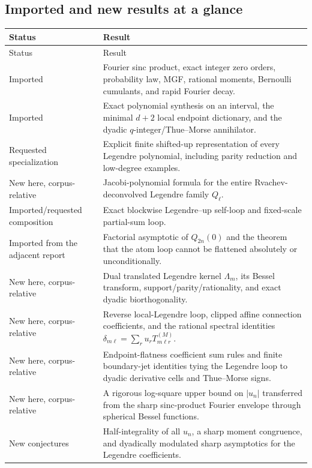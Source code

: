\documentclass[11pt,oneside]{article}
\numberwithin{equation}{section}
\theoremstyle{definition}
\theoremstyle{remark}
\begin{document}
\subsection{Imported and new results at a glance}

\begin{longtable}{@{}p{}p{}@{}}
\toprule
Status & Result \\
\midrule
\endfirsthead
\toprule Status & Result \\
\midrule
\endhead
Imported & Fourier sinc product, exact integer zero orders, probability law,
MGF, rational moments, Bernoulli cumulants, and rapid Fourier decay. \\
Imported & Exact polynomial synthesis on an interval, the minimal $d+2$ local
endpoint dictionary, and the dyadic $q$-integer/Thue--Morse annihilator. \\
Requested specialization & Explicit finite shifted-up representation of every
Legendre polynomial, including parity reduction and low-degree examples. \\
New here, corpus-relative & Jacobi-polynomial formula for the entire
Rvachev-deconvolved Legendre family $Q_\ell$. \\
Imported/requested composition & Exact blockwise
Legendre--up self-loop and fixed-scale partial-sum loop. \\
Imported from the adjacent report & Factorial asymptotic of $Q_{2n}(0)$ and
the theorem that the atom loop cannot be flattened absolutely or
unconditionally. \\
New here, corpus-relative & Dual translated Legendre kernel $\Lambda_m$,
its Bessel transform, support/parity/rationality, and exact dyadic
biorthogonality. \\
New here, corpus-relative & Reverse local-Legendre loop, clipped affine
connection coefficients, and the rational spectral identities
$\delta_{m\ell}=\sum_ru_rT_{m\ell r}^{(M)}$. \\
New here, corpus-relative & Endpoint-flatness coefficient sum rules and
finite boundary-jet identities tying the Legendre loop to dyadic derivative
cells and Thue--Morse signs. \\
New here, corpus-relative & A rigorous log-square upper bound on $|u_n|$
transferred from the sharp sinc-product Fourier envelope through spherical
Bessel functions. \\
New conjectures & Half-integrality of all $u_n$, a sharp moment congruence,
and dyadically modulated sharp asymptotics for the Legendre coefficients. \\
\bottomrule
\end{longtable}
\end{document}
